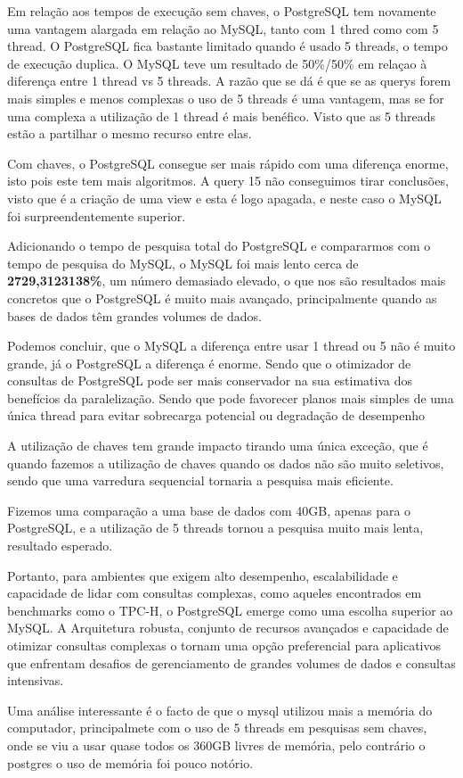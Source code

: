 \documentclass{article}
\begin{document}
Em relação aos tempos de execução sem chaves, o PostgreSQL tem novamente uma vantagem alargada em relação ao MySQL, tanto com 1 thred como com 5 thread. O PostgreSQL fica bastante limitado quando é usado 5 threads, o tempo de execução duplica. O MySQL teve um resultado de 50\%/50\% em relaçao à diferença entre 1 thread vs 5 threads. A razão que se dá é que se as querys forem mais simples e menos complexas o uso de 5 threads é uma vantagem, mas se for uma complexa a utilização de 1 thread é mais benéfico. Visto que as 5 threads estão a partilhar o mesmo recurso entre elas.

Com chaves, o PostgreSQL consegue ser mais rápido com uma diferença enorme, isto pois este tem mais algoritmos. A query 15 não conseguimos tirar conclusões, visto que é a criação de uma view e esta é logo apagada, e neste caso o MySQL foi surpreendentemente superior.

Adicionando o tempo de pesquisa total do PostgreSQL e compararmos com o tempo de pesquisa do MySQL, o MySQL foi mais lento cerca de \textbf{2729,3123138\%}, um número demasiado elevado, o que nos são resultados mais concretos que o PostgreSQL é muito mais avançado, principalmente quando as bases de dados têm grandes volumes de dados.

Podemos concluir, que o MySQL a diferença entre usar 1 thread ou 5 não é muito grande, já o PostgreSQL a diferença é enorme. Sendo que  o otimizador de consultas
de PostgreSQL pode ser mais conservador na sua estimativa dos benefícios da paralelização. Sendo
que pode favorecer planos mais simples de uma única thread para evitar sobrecarga potencial ou
degradação de desempenho

A utilização de chaves tem grande impacto tirando uma única exceção, que é quando fazemos a utilização de chaves quando os dados não são muito seletivos, sendo que uma varredura sequencial tornaria a pesquisa mais eficiente.

Fizemos uma comparação a uma base de dados com 40GB, apenas para o PostgreSQL, e a utilização de 5 threads tornou a pesquisa muito mais lenta, resultado esperado.

Portanto, para ambientes que exigem alto desempenho, escalabilidade e capacidade de lidar com consultas complexas, como aqueles encontrados em benchmarks como o TPC-H, o PostgreSQL emerge como uma escolha superior ao MySQL. A Arquitetura robusta, conjunto de recursos avançados e capacidade de otimizar consultas complexas o tornam uma opção preferencial para aplicativos que enfrentam desafios de gerenciamento de grandes volumes de dados e consultas intensivas.

Uma análise interessante é o facto de que o mysql utilizou mais a memória do computador, principalmete com o uso de 5 threads em pesquisas sem chaves, onde se viu a usar quase todos os 360GB livres de memória, pelo contrário o postgres o uso de memória foi pouco notório.
\end{document}
